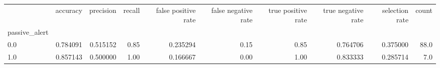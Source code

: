 \begin{tabular}{lrrrrrrrrr}
\toprule
{} &  accuracy &  precision &  recall &  false positive rate &  false negative rate &  true positive rate &  true negative rate &  selection rate &  count \\
passive\_alert &           &            &         &                      &                      &                     &                     &                 &        \\
\midrule
0.0           &  0.784091 &   0.515152 &    0.85 &             0.235294 &                 0.15 &                0.85 &            0.764706 &        0.375000 &   88.0 \\
1.0           &  0.857143 &   0.500000 &    1.00 &             0.166667 &                 0.00 &                1.00 &            0.833333 &        0.285714 &    7.0 \\
\bottomrule
\end{tabular}
